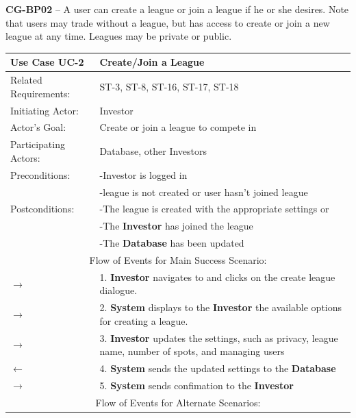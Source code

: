 \textbf{CG-BP02} – A user can create a league or join a league if he or she desires. Note that
users may trade without a league, but has access to create or join a new league at any time.
Leagues may be private or public. \\


\begin{centering}
\renewcommand\arraystretch{1.3}
\label{UC-2}
\begin{longtable}{|p{1.2in} p{5in}|}
\hline
\bfseries{\color{color1}Use Case UC-2} &
\bfseries{\color{color1}Create/Join a League} \\
\hline
Related Requirements: & ST-3, ST-8, ST-16, ST-17, ST-18\\
Initiating Actor:     & Investor \\
Actor's Goal:         & Create or join a league to compete in\\
Participating Actors: & Database, other Investors \\
Preconditions:        & -Investor is logged in \\
                      & -league is not created or user hasn't joined league \\
Postconditions:       & -The league is created with the appropriate settings or \\
                      & -The \textbf{Investor} has joined the league \\
                      & -The \textbf{Database} has been updated \\
\hline
\multicolumn{2}{|c|}{\color{color1}Flow of Events for Main Success Scenario:}\\
\hline

$\rightarrow$ & 1. \textbf{Investor} navigates to and clicks on the create league dialogue. \\
$\rightarrow$ & 2. \textbf{System} displays to the \textbf{Investor} the available options for
creating a league.  \\
$\rightarrow$ & 3. \textbf{Investor} updates the settings, such as privacy, league name, number of spots, and managing users \\
$\leftarrow$ & 4. \textbf{System} sends the updated settings to the \textbf{Database} \\
$\rightarrow$ & 5. \textbf{System} sends confimation to the \textbf{Investor} \\
\hline

\multicolumn{2}{|c|}{\color{color1}Flow of Events for Alternate Scenarios:} \\
\hline


\end{longtable}
\end{centering}
